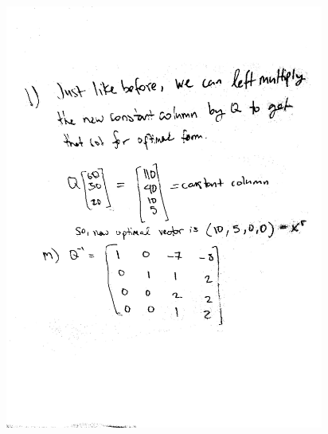\documentclass[a4paper,12pt]{article}
\begin{document}
\includegraphics[width=14cm, height=14cm, keepaspectratio=true]{image/sixthree3.jpg}
\end{document}
